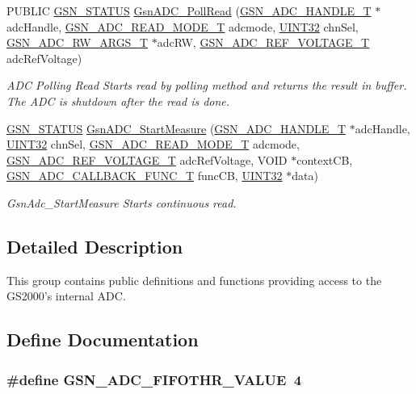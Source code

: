 \begin{DoxyCompactItemize}
PUBLIC \hyperlink{a00660_gada5951904ac6110b1fa95e51a9ddc217}{GSN\_\-STATUS} \hyperlink{a00643_gaab53aee6b55a63e421310ec8a818dcb1}{GsnADC\_\-PollRead} (\hyperlink{a00024}{GSN\_\-ADC\_\-HANDLE\_\-T} $\ast$adcHandle, \hyperlink{a00643_ga67df3ab0d6b619d585d941ad1f3f0233}{GSN\_\-ADC\_\-READ\_\-MODE\_\-T} adcmode, \hyperlink{a00660_gae1e6edbbc26d6fbc71a90190d0266018}{UINT32} chnSel, \hyperlink{a00025}{GSN\_\-ADC\_\-RW\_\-ARGS\_\-T} $\ast$adcRW, \hyperlink{a00643_ga560e320e7f3b88d78bb8d8766a8c7445}{GSN\_\-ADC\_\-REF\_\-VOLTAGE\_\-T} adcRefVoltage)
\begin{DoxyCompactList}\small\item\em ADC Polling Read Starts read by polling method and returns the result in buffer. The ADC is shutdown after the read is done. \end{DoxyCompactList}\item 
\hyperlink{a00660_gada5951904ac6110b1fa95e51a9ddc217}{GSN\_\-STATUS} \hyperlink{a00643_gab93bdcc54f8ab4870ef3b5a12ac1c920}{GsnADC\_\-StartMeasure} (\hyperlink{a00024}{GSN\_\-ADC\_\-HANDLE\_\-T} $\ast$adcHandle, \hyperlink{a00660_gae1e6edbbc26d6fbc71a90190d0266018}{UINT32} chnSel, \hyperlink{a00643_ga67df3ab0d6b619d585d941ad1f3f0233}{GSN\_\-ADC\_\-READ\_\-MODE\_\-T} adcmode, \hyperlink{a00643_ga560e320e7f3b88d78bb8d8766a8c7445}{GSN\_\-ADC\_\-REF\_\-VOLTAGE\_\-T} adcRefVoltage, VOID $\ast$contextCB, \hyperlink{a00643_ga988a548c116a5b35c3725a268f74519a}{GSN\_\-ADC\_\-CALLBACK\_\-FUNC\_\-T} funcCB, \hyperlink{a00660_gae1e6edbbc26d6fbc71a90190d0266018}{UINT32} $\ast$data)
\begin{DoxyCompactList}\small\item\em GsnAdc\_\-StartMeasure Starts continuous read. \end{DoxyCompactList}\end{DoxyCompactItemize}


\subsection{Detailed Description}
This group contains public definitions and functions providing access to the GS2000's internal ADC. 

\subsection{Define Documentation}
\hypertarget{a00643_ga757ecde6d25c53dab837e48c83a16b46}{
\subsubsection[{GSN\_\-ADC\_\-FIFOTHR\_\-VALUE}]{\setlength{\rightskip}{0pt plus 5cm}\#define GSN\_\-ADC\_\-FIFOTHR\_\-VALUE~4}}
\label{a00643_ga757ecde6d25c53dab837e48c83a16b46}


